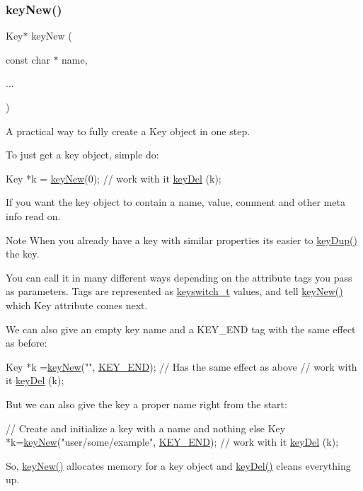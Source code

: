 \subsubsection{\texorpdfstring{key\+New()}{keyNew()}}
{\footnotesize\ttfamily Key$\ast$ key\+New (\begin{DoxyParamCaption}\item[{const char $\ast$}]{name,  }\item[{}]{... }\end{DoxyParamCaption})}



A practical way to fully create a Key object in one step. 

To just get a key object, simple do\+:


\begin{DoxyCodeInclude}
Key *k = \hyperlink{group__key_gad23c65b44bf48d773759e1f9a4d43b89}{keyNew}(0);
\textcolor{comment}{// work with it}
\hyperlink{group__key_ga3df95bbc2494e3e6703ece5639be5bb1}{keyDel} (k);
\end{DoxyCodeInclude}
 If you want the key object to contain a name, value, comment and other meta info read on.

\begin{DoxyNote}{Note}
When you already have a key with similar properties its easier to \hyperlink{group__key_gae6ec6a60cc4b8c1463fa08623d056ce3}{key\+Dup()} the key.
\end{DoxyNote}
You can call it in many different ways depending on the attribute tags you pass as parameters. Tags are represented as \hyperlink{group__key_ga91fb3178848bd682000958089abbaf40}{keyswitch\+\_\+t} values, and tell \hyperlink{group__key_gad23c65b44bf48d773759e1f9a4d43b89}{key\+New()} which Key attribute comes next.

We can also give an empty key name and a K\+E\+Y\+\_\+\+E\+ND tag with the same effect as before\+:


\begin{DoxyCodeInclude}
Key *k =\hyperlink{group__key_gad23c65b44bf48d773759e1f9a4d43b89}{keyNew}(\textcolor{stringliteral}{""}, \hyperlink{group__key_gga91fb3178848bd682000958089abbaf40aa8adb6fcb92dec58fb19410eacfdd403}{KEY\_END}); \textcolor{comment}{// Has the same effect as above}
\textcolor{comment}{// work with it}
\hyperlink{group__key_ga3df95bbc2494e3e6703ece5639be5bb1}{keyDel} (k);
\end{DoxyCodeInclude}
 But we can also give the key a proper name right from the start\+:


\begin{DoxyCodeInclude}
\textcolor{comment}{// Create and initialize a key with a name and nothing else}
Key *k=\hyperlink{group__key_gad23c65b44bf48d773759e1f9a4d43b89}{keyNew}(\textcolor{stringliteral}{"user/some/example"}, \hyperlink{group__key_gga91fb3178848bd682000958089abbaf40aa8adb6fcb92dec58fb19410eacfdd403}{KEY\_END});
\textcolor{comment}{// work with it}
\hyperlink{group__key_ga3df95bbc2494e3e6703ece5639be5bb1}{keyDel} (k);
\end{DoxyCodeInclude}
 So, \hyperlink{group__key_gad23c65b44bf48d773759e1f9a4d43b89}{key\+New()} allocates memory for a key object and \hyperlink{group__key_ga3df95bbc2494e3e6703ece5639be5bb1}{key\+Del()} cleans everything up.

